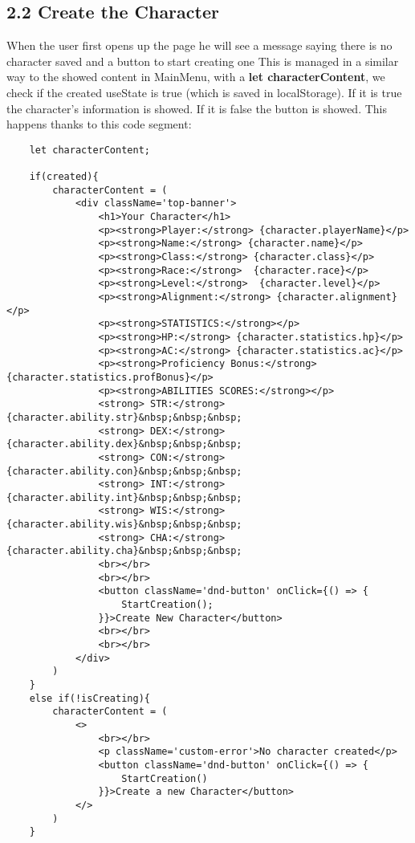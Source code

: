 \documentclass[
]{article}
\begin{document}
\begin{flushleft}
\subsection{2.2 Create the Character}\label{creastion}

When the user first opens up the page he will see a message saying there is no character saved and a button to start creating one
This is managed in a similar way to the showed content in MainMenu, with a \textbf{let characterContent}, we check if the created useState is true (which is saved in localStorage).
If it is true the character's information is showed.
If it is false the button is showed.
This happens thanks to this code segment: 

\begin{verbatim}
    let characterContent;

    if(created){
        characterContent = (
            <div className='top-banner'>
                <h1>Your Character</h1>
                <p><strong>Player:</strong> {character.playerName}</p>
                <p><strong>Name:</strong> {character.name}</p>
                <p><strong>Class:</strong> {character.class}</p>
                <p><strong>Race:</strong>  {character.race}</p>
                <p><strong>Level:</strong>  {character.level}</p>
                <p><strong>Alignment:</strong> {character.alignment}</p>
                <p><strong>STATISTICS:</strong></p>
                <p><strong>HP:</strong> {character.statistics.hp}</p>
                <p><strong>AC:</strong> {character.statistics.ac}</p>
                <p><strong>Proficiency Bonus:</strong> {character.statistics.profBonus}</p>
                <p><strong>ABILITIES SCORES:</strong></p>
                <strong> STR:</strong> {character.ability.str}&nbsp;&nbsp;&nbsp;
                <strong> DEX:</strong> {character.ability.dex}&nbsp;&nbsp;&nbsp;
                <strong> CON:</strong> {character.ability.con}&nbsp;&nbsp;&nbsp;
                <strong> INT:</strong> {character.ability.int}&nbsp;&nbsp;&nbsp;
                <strong> WIS:</strong> {character.ability.wis}&nbsp;&nbsp;&nbsp;
                <strong> CHA:</strong> {character.ability.cha}&nbsp;&nbsp;&nbsp;
                <br></br>
                <br></br>
                <button className='dnd-button' onClick={() => {
                    StartCreation();
                }}>Create New Character</button>
                <br></br>
                <br></br>
            </div>
        )    
    }
    else if(!isCreating){
        characterContent = (
            <>
                <br></br>
                <p className='custom-error'>No character created</p>
                <button className='dnd-button' onClick={() => {
                    StartCreation()
                }}>Create a new Character</button>
            </>
        )
    }
\end{verbatim}


\end{flushleft}
\end{document}
